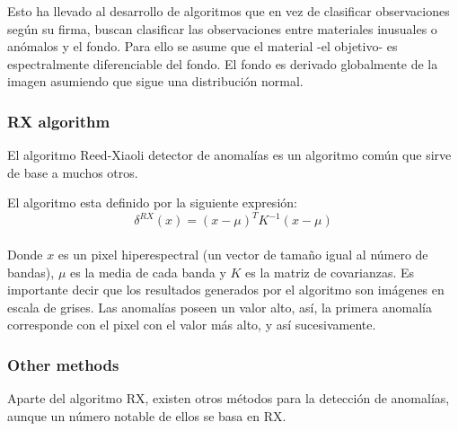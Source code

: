 Esto ha llevado al desarrollo de algoritmos que en vez de clasificar observaciones según su firma, buscan clasificar las observaciones entre materiales inusuales o anómalos y el fondo. Para ello se asume que el material -el objetivo- es espectralmente diferenciable del fondo. El fondo es derivado globalmente de la imagen asumiendo que sigue una distribución normal.


\subsubsection{RX algorithm}
El algoritmo Reed-Xiaoli detector de anomalías es un algoritmo común que sirve de base a muchos otros.%

El algoritmo esta definido por la siguiente expresión\citep{molero_fast_2011}:
\\
\[\delta ^{RX}(x) = (x-\mu)^{T}K^{-1}(x-\mu)\]

\paragraph{}
\label{mayor}
Donde $x$ es un pixel hiperespectral (un vector de tamaño igual al número de bandas), $\mu$ es la media de cada banda y $K$ es la matriz de covarianzas. Es importante decir que los resultados generados por el algoritmo son imágenes en escala de grises. Las anomalías poseen un valor alto, así, la primera anomalía corresponde con el pixel con el valor más alto, y así sucesivamente.

\subsubsection{Other methods}
Aparte del algoritmo RX, existen otros métodos para la detección de anomalías, aunque un número notable de ellos se basa en RX.

